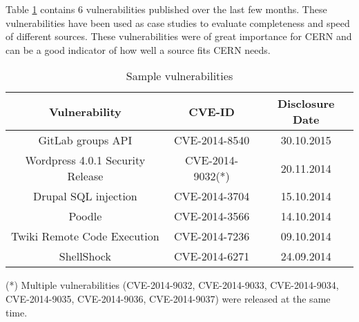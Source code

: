 Table \ref{table:sample_vulns} contains 6 vulnerabilities published over the last few months. These vulnerabilities have been used as case studies to evaluate completeness and speed of different sources. These vulnerabilities were of great importance for CERN and can be a good indicator of how well a source fits CERN needs.
\begin{table}
\begin{center}
    \begin{tabular}{ | c | c | c| }
    
    \hline
    \hhline{|*3-}
	\rowcolor{LightBlue}    
    \textbf{Vulnerability} & \textbf{CVE-ID} & \textbf{Disclosure Date} 
    \\ \hline
    GitLab groups API & CVE-2014-8540 & 30.10.2015
      \\ \hline
    Wordpress 4.0.1 Security Release & CVE-2014-9032(*)  & 20.11.2014
    \\ \hline
    Drupal SQL injection
 & CVE-2014-3704
 & 15.10.2014 
  \\
    \hline

 Poodle
 & CVE-2014-3566
 & 14.10.2014
  \\
    \hline

Twiki Remote Code Execution
 & CVE-2014-7236
 & 09.10.2014
 \\
    \hline

ShellShock
 & CVE-2014-6271
 & 24.09.2014
  \\
    \hline

    \end{tabular}
    \caption{Sample vulnerabilities}
    \label{table:sample_vulns}
     \footnotesize{(*) Multiple vulnerabilities (CVE-2014-9032, CVE-2014-9033, CVE-2014-9034, CVE-2014-9035, CVE-2014-9036, CVE-2014-9037) were released at the same time.}
   \end{center}
   
\end{table}


